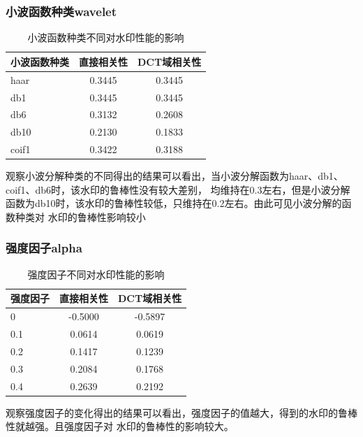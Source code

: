 \documentclass[a4paper,11pt,UTF8]{ctexart}
\begin{document}
    \subsubsection{小波函数种类wavelet}
      \begin{table}[H]
        \caption{小波函数种类不同对水印性能的影响}\label{tab2}
          \centering
        \begin{tabular*}{0.75\textwidth}{@{\extracolsep{\fill}}lcc}
            \toprule
            小波函数种类           &直接相关性        &DCT域相关性                         \\
            \midrule
            haar                     &0.3445           &0.3445                                      \\
            db1                      &0.3445           &0.3445                                      \\
            db6                      &0.3132           &0.2608                                        \\
            db10                     &0.2130           &0.1833                                    \\ 
            coif1                    &0.3422           &0.3188\\
            \bottomrule
        \end{tabular*}
      \end{table}
      观察小波分解种类的不同得出的结果可以看出，当小波分解函数为haar、db1、coif1、db6时，该水印的鲁棒性没有较大差别，
      均维持在0.3左右，但是小波分解函数为db10时，该水印的鲁棒性较低，只维持在0.2左右。由此可见小波分解的函数种类对
      水印的鲁棒性影响较小

    \subsubsection{强度因子alpha}
      \begin{table}[H]
        \caption{强度因子不同对水印性能的影响}\label{tab3}
          \centering
        \begin{tabular*}{0.75\textwidth}{@{\extracolsep{\fill}}lcc}
            \toprule
            强度因子                 &直接相关性        &DCT域相关性                         \\
            \midrule
            0                       &-0.5000           &-0.5897                                      \\
            0.1                     &0.0614           &0.0619                                      \\
            0.2                     &0.1417           &0.1239                                        \\
            0.3                     &0.2084           &0.1768                                    \\ 
            0.4                     &0.2639           &0.2192\\
            \bottomrule
        \end{tabular*}
      \end{table}
      观察强度因子的变化得出的结果可以看出，强度因子的值越大，得到的水印的鲁棒性就越强。且强度因子对
      水印的鲁棒性的影响较大。
\end{document}
